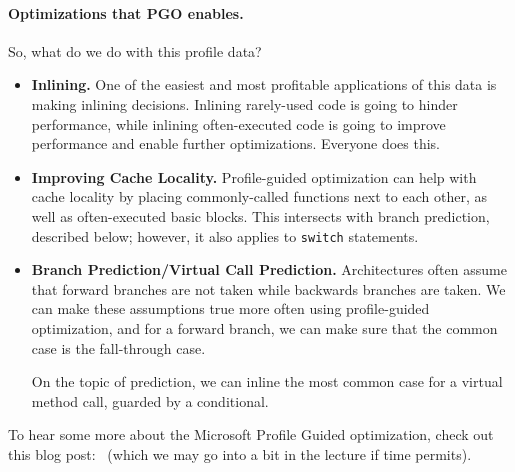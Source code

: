 \vspace*{-1em}
\paragraph{Optimizations that PGO enables.} So, what do we do with
this profile data? 
\begin{itemize}
\item {\bf Inlining.} One of the easiest and most profitable applications
of this data is making inlining decisions. Inlining rarely-used code
is going to hinder performance, while inlining often-executed code
is going to improve performance and enable further optimizations.
Everyone does this.
\item {\bf Improving Cache Locality.} Profile-guided optimization can
help with cache locality by placing commonly-called functions next
to each other, as well as often-executed basic blocks. This intersects
with branch prediction, described below; however, it also applies to
{\tt switch} statements.
\item {\bf Branch Prediction/Virtual Call Prediction.} Architectures
often assume that forward branches are not taken while backwards branches
are taken. We can make these assumptions true more often using profile-guided
optimization, and for a forward branch, we can make sure that the common
case is the fall-through case.

On the topic of prediction, we can inline the most common case for 
a virtual method call, guarded by a conditional.
\end{itemize}

To hear some more about the Microsoft Profile Guided optimization, check out this blog post:~\cite{msdn:pgo} (which we may go into a bit in the lecture if time permits).






